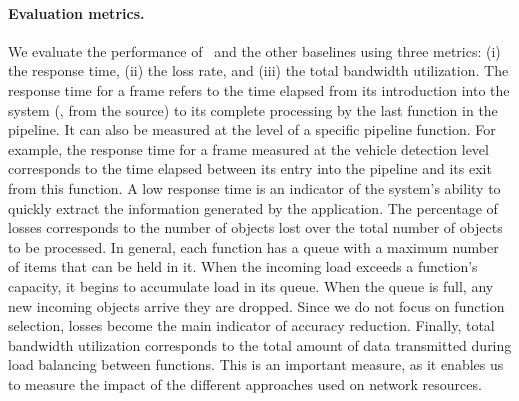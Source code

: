 \paragraph{Evaluation metrics.} We evaluate the performance of~\videojam{} and the other baselines using three metrics: (i) the response time, (ii) the loss rate, and (iii) the total bandwidth utilization. The response time for a frame refers to the time elapsed from its introduction into the system (\ie, from the source)
to its complete processing by the last function in the pipeline. It can also be measured at the level of a specific pipeline function. For example, the response time for a frame measured at the vehicle detection level corresponds to the time elapsed between its entry into the pipeline and its exit from this function. A low response time is an indicator of the system's ability to quickly extract the
information generated by the application. The percentage of losses corresponds to the number of objects lost over the total number of objects to be processed.
In general, each function has a queue with a maximum number of items that can be held in it. When the incoming load exceeds a function's capacity, it begins to accumulate load in its queue. When the queue is full, any new incoming objects arrive they are dropped. Since we do not focus on function selection, losses
become the main indicator of accuracy reduction. Finally, total bandwidth utilization corresponds to the total amount of data transmitted during load balancing between functions. This is an important measure, as it enables us to measure the impact of the different approaches used on network resources.

